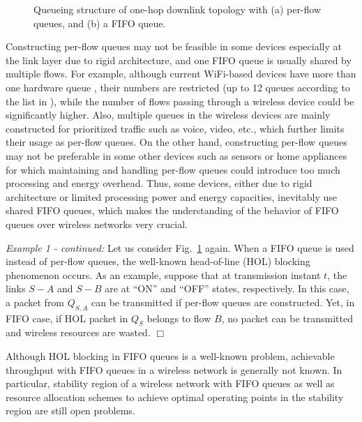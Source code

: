 \documentclass[conference]{IEEEtran}
\begin{document}
\begin{figure}[t!]
\vspace{-20pt}
\centering
{}
\vspace{-5pt}
\caption{Queueing structure of one-hop downlink topology with (a) per-flow queues, and (b) a FIFO queue. } \label{fig:example_fifo_v1}
\vspace{-15pt}
\end{figure}

Constructing per-flow queues may not be feasible in some devices especially at the link layer due to rigid architecture, and one FIFO queue is usually shared by multiple flows. For example, although current WiFi-based devices have more than one hardware queue \cite{madwifi_chipsets}, their numbers are restricted (up to 12 queues according to the list in \cite{madwifi_chipsets}), while the number of flows passing through a wireless device could be significantly higher. Also, multiple queues in the wireless devices are mainly constructed for prioritized traffic such as voice, video, etc., which further limits their usage as per-flow queues. 
On the other hand, constructing per-flow queues may not be preferable in some other devices such as sensors or home appliances for which maintaining and handling per-flow queues could introduce too much processing and energy overhead. Thus, some devices, either due to rigid architecture or limited processing power and energy capacities, inevitably use shared FIFO queues, which makes the understanding of the behavior of FIFO queues over wireless networks very crucial.


{\em Example 1 - continued:}
Let us consider Fig.~\ref{fig:example_fifo_v1} again. When a FIFO queue is used instead of per-flow queues, the well-known head-of-line (HOL) blocking phenomenon occurs. As an example, suppose that at transmission instant $t$, the links $S-A$ and $S-B$ are at ``ON'' and ``OFF'' states, respectively. In this case, a packet from $Q_{S,A}$ can be transmitted if per-flow queues are constructed. Yet, in FIFO case, if HOL packet in $Q_S$ belongs to flow $B$, no packet can be transmitted and wireless resources are wasted.
\hfill $\Box$

Although HOL blocking in FIFO queues is a well-known problem, achievable throughput with FIFO queues in a wireless network is generally not known. In particular, stability region of a wireless network with FIFO queues as well as resource allocation schemes to achieve optimal operating points in the stability region are still open problems.
\end{document}
